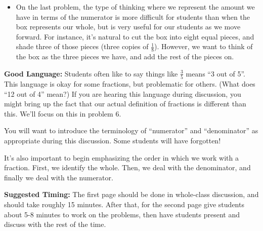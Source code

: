 \documentclass{ximera}
\begin{document}
\begin{instructorNotes}
\begin{itemize}
	\item On the last problem, the type of thinking where we represent the amount we have in terms of the numerator is more difficult for students than when the box represents our whole, but is very useful for our students as we move forward. For instance, it's natural to cut the box into eight equal pieces, and shade three of those pieces (three copies of $\frac18$). However, we want to think of the   box as the three pieces we have, and add the rest of the pieces on.
\end{itemize}



{\bf Good Language:} Students often like to say things like $\frac{3}{5}$ means ``3 out of 5''. This language is okay for some fractions, but problematic for others. (What does ``12 out of 4'' mean?) If you are hearing this language during discussion, you might bring up the fact that our actual definition of fractions is different than this. We'll focus on this in problem 6.

You will want to introduce the terminology of ``numerator'' and ``denominator'' as appropriate during this discussion. Some students will have forgotten!

It's also important to begin emphasizing the order in which we work with a fraction. First, we identify the whole. Then, we deal with the denominator, and finally we deal with the numerator. 



{\bf Suggested Timing:} The first page should be done in whole-class discussion, and should take roughly 15 minutes. After that, for the second page give students about 5-8 minutes to work on the problems, then have students present and discuss with the rest of the time.

\end{instructorNotes}
\end{document}
